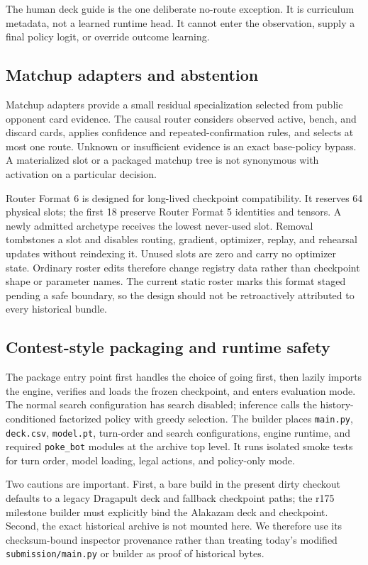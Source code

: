\documentclass[10pt]{article}
\begin{document}
The human deck guide is the one deliberate no-route exception. It is curriculum metadata, not a learned runtime head. It cannot enter the observation, supply a final policy logit, or override outcome learning.

\subsection{Matchup adapters and abstention}

Matchup adapters provide a small residual specialization selected from public opponent card evidence. The causal router considers observed active, bench, and discard cards, applies confidence and repeated-confirmation rules, and selects at most one route. Unknown or insufficient evidence is an exact base-policy bypass. A materialized slot or a packaged matchup tree is not synonymous with activation on a particular decision.

Router Format 6 is designed for long-lived checkpoint compatibility. It reserves 64 physical slots; the first 18 preserve Router Format 5 identities and tensors. A newly admitted archetype receives the lowest never-used slot. Removal tombstones a slot and disables routing, gradient, optimizer, replay, and rehearsal updates without reindexing it. Unused slots are zero and carry no optimizer state. Ordinary roster edits therefore change registry data rather than checkpoint shape or parameter names. The current static roster marks this format staged pending a safe boundary, so the design should not be retroactively attributed to every historical bundle.

\subsection{Contest-style packaging and runtime safety}

The package entry point first handles the choice of going first, then lazily imports the engine, verifies and loads the frozen checkpoint, and enters evaluation mode. The normal search configuration has search disabled; inference calls the history-conditioned factorized policy with greedy selection. The builder places \texttt{main.py}, \texttt{deck.csv}, \texttt{model.pt}, turn-order and search configurations, engine runtime, and required \texttt{poke\_bot} modules at the archive top level. It runs isolated smoke tests for turn order, model loading, legal actions, and policy-only mode.

Two cautions are important. First, a bare build in the present dirty checkout defaults to a legacy Dragapult deck and fallback checkpoint paths; the r175 milestone builder must explicitly bind the Alakazam deck and checkpoint. Second, the exact historical archive is not mounted here. We therefore use its checksum-bound inspector provenance rather than treating today's modified \texttt{submission/main.py} or builder as proof of historical bytes.
\end{document}

